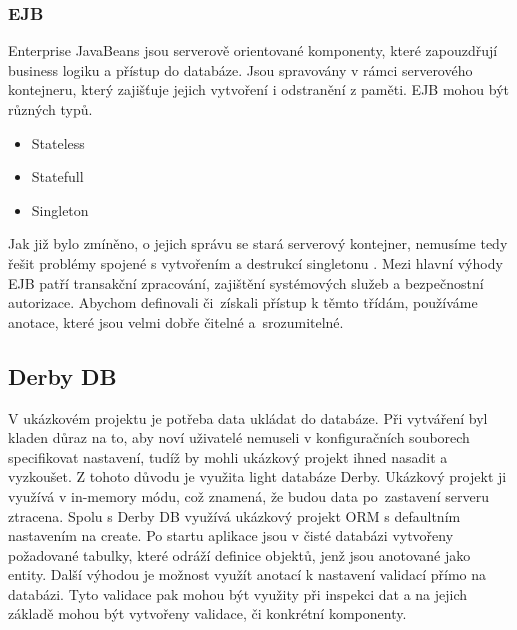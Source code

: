 \subsubsection{EJB}
Enterprise JavaBeans \cite{javaEETutorial} jsou serverově orientované komponenty, které zapouzdřují business logiku a přístup do databáze. Jsou spravovány v rámci serverového kontejneru, který zajišťuje jejich vytvoření i odstranění z paměti. EJB mohou být různých typů.
\begin{itemize}
\item Stateless
\item Statefull
\item Singleton
\end{itemize}
Jak již bylo zmíněno, o jejich správu se stará serverový kontejner, nemusíme tedy řešit problémy spojené s vytvořením a destrukcí singletonu \cite{gamma}. Mezi hlavní výhody EJB patří transakční zpracování, zajištění systémových služeb a bezpečnostní autorizace. Abychom definovali či~získali přístup k těmto třídám, používáme anotace, které jsou velmi dobře čitelné a~srozumitelné.
\subsection{Derby DB}
V ukázkovém projektu je potřeba data ukládat do databáze. Při vytváření byl kladen důraz na to, aby noví uživatelé nemuseli v konfiguračních souborech specifikovat nastavení, tudíž by mohli ukázkový projekt ihned nasadit a vyzkoušet. Z tohoto důvodu je využita light databáze Derby. Ukázkový projekt ji využívá v in-memory módu, což znamená, že budou data po~zastavení serveru ztracena. Spolu s Derby DB využívá ukázkový projekt ORM s defaultním nastavením na create. Po startu aplikace jsou v čisté databázi vytvořeny požadované tabulky, které odráží definice objektů, jenž jsou anotované jako entity. Další výhodou je možnost využít anotací k nastavení validací přímo na databázi. Tyto validace pak mohou být využity při inspekci dat a na jejich základě mohou být vytvořeny validace, či konkrétní komponenty.